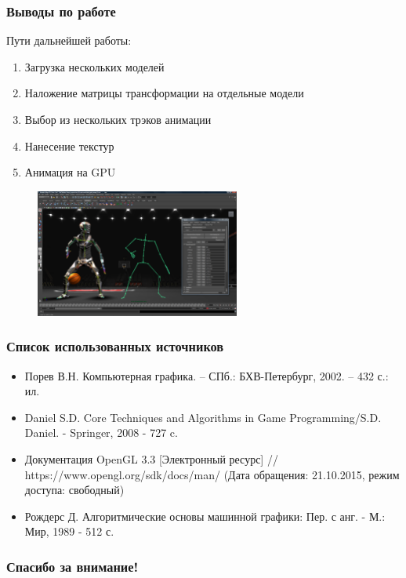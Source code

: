 \documentclass{beamer}
\begin{document}
\begin{frame}
\frametitle{Выводы по работе}
    Пути дальнейшей работы:
\begin{enumerate} 
	\item Загрузка нескольких моделей
	\item Наложение матрицы трансформации на отдельные модели
	\item Выбор из нескольких трэков анимации
	\item Нанесение текстур
	\item Анимация на GPU
\end{enumerate}

\begin{figure}[h!]
    \flushright
    \includegraphics[width=0.6\textwidth]{win_maya.png}
\end{figure}

\end{frame}




\begin{frame}
\frametitle{Список использованных источников}
\begin{itemize}
\item
Порев В.Н. Компьютерная графика. – СПб.: БХВ-Петербург, 2002. – 432 с.: ил.

\item 
Daniel S.D. Core Techniques and Algorithms in Game Programming/S.D. Daniel. - Springer, 2008 - 727 c.

\item
Документация OpenGL 3.3 [Электронный ресурс] // https://www.opengl.org/sdk/docs/man/ (Дата обращения: 21.10.2015, режим доступа: свободный)

\item
Рождерс Д. Алгоритмические основы машинной графики: Пер. с анг. - М.: Мир, 1989 - 512 с.
    
\end{itemize}
\end{frame}



\begin{frame}[c]
\begin{center}
\frametitle{\LARGE Спасибо за внимание!}

{\LARGE \inserttitle}

\bigskip

{\insertauthor}

\bigskip\bigskip

{\insertinstitute}

\bigskip\bigskip

{\large \insertdate}
\end{center}
\end{frame}
\end{document}
